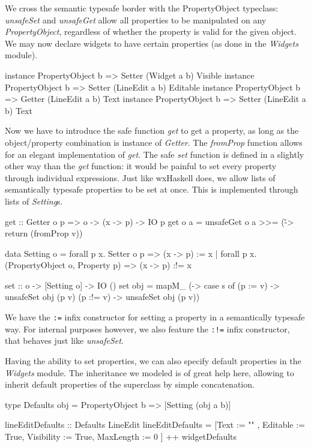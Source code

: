 \documentclass[11pt,a4paper]{article}
\begin{document}
We cross the semantic typesafe border with the PropertyObject typeclass: \textit{unsafeSet} and \textit{unsafeGet} allow all properties to be manipulated on any \textit{PropertyObject}, regardless of whether the property is valid for the given object.
We may now declare widgets to have certain properties (as done in the \textit{Widgets} module).

\begin{haskell}
instance PropertyObject b => Setter (Widget a b) Visible
instance PropertyObject b => Setter (LineEdit a b) Editable
instance PropertyObject b => Getter (LineEdit a b) Text
instance PropertyObject b => Setter (LineEdit a b) Text
\end{haskell}

Now we have to introduce the safe function \textit{get} to get a property, as long as the object/property combination is instance of \textit{Getter}.
The \textit{fromProp} function allows for an elegant implementation of \textit{get}.
The safe \textit{set} function is defined in a slightly other way than the \textit{get} function: it would be painful to set every property through individual expressions.
Just like wxHaskell does, we allow lists of semantically typesafe properties to be set at once.
This is implemented through lists of \textit{Setting}s.

\begin{haskell}
get :: Getter o p => o -> (x -> p) -> IO p
get o a = unsafeGet o a >>= (\v -> return (fromProp v))

data Setting o
  = forall p x. Setter o p => (x -> p) := x
  | forall p x. (PropertyObject o, Property p) => (x -> p) :!= x

set :: o -> [Setting o] -> IO ()
set obj = mapM_ (\s -> case s of
                         (p := v)  -> unsafeSet obj (p v)
                         (p :!= v) -> unsafeSet obj (p v))
\end{haskell}

We have the \texttt{:=} infix constructor for setting a property in a semantically typesafe way.
For internal purposes however, we also feature the \texttt{:!=} infix constructor, that behaves just like \textit{unsafeSet}.

Having the ability to set properties, we can also specify default properties in the \textit{Widgets} module.
The inheritance we modeled is of great help here, allowing to inherit default properties of the superclass by simple concatenation.
\begin{haskell}
type Defaults obj = PropertyObject b => [Setting (obj a b)]

lineEditDefaults :: Defaults LineEdit
lineEditDefaults = [Text       := ""  ,
                    Editable   := True,
                    Visibility := True,
                    MaxLength  := 0   ]
                   ++ widgetDefaults
\end{haskell}
\end{document}
